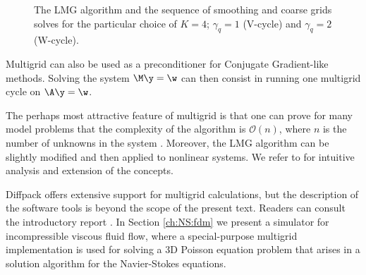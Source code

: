 \begin{figure}
\centerline{}
\caption{\label{linalg:MG:fig2}
The LMG algorithm and the sequence of smoothing and coarse grids solves
for the particular choice of $K=4$;
$\gamma_q=1$ (V-cycle) and $\gamma_q=2$ (W-cycle).}
\end{figure}

Multigrid can also be used as a preconditioner for Conjugate Gradient-like
methods. Solving the system $\M\y =\w$ can then consist in
running one multigrid cycle on $\A\y =\w$.

The perhaps most attractive feature of multigrid is that one can prove
for many model problems that the complexity of the algorithm is
$\mathcal{O}(n)$, where $n$ is the number of unknowns in the system
\cite{Wesseling92}.  Moreover, the LMG algorithm can be slightly
modified and then applied to nonlinear systems.  We refer to
\cite{Wesseling92} for intuitive analysis and extension of the
concepts.

Diffpack offers extensive support for multigrid calculations, but the
description of the software tools is beyond the scope of the present
text. Readers can consult the introductory report \cite{DPMGintro}.
In Section \ref{ch:NS:fdm} we present a simulator for
incompressible viscous fluid flow, where a special-purpose
multigrid implementation
is used for solving a 3D Poisson equation problem
that arises in a solution algorithm for the Navier-Stokes equations.





